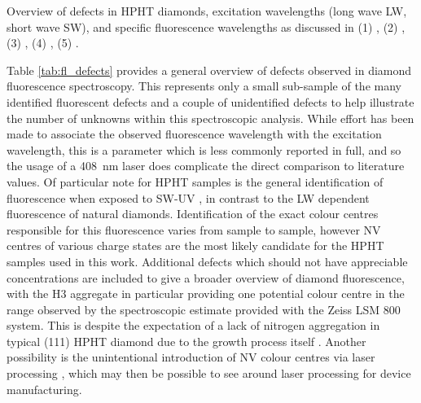 \begin{refsection}
\begin{table}[h]
\caption{Overview of defects in HPHT diamonds, excitation wavelengths (long wave LW, short wave SW), and specific fluorescence wavelengths as discussed in (1) \cite{eaton2017}, (2) \cite{burachenko2021}, (3) \cite{shigley2013}, (4) \cite{shenderova2019}, (5) \cite{Hardman2022}.}
\label{tab:fl_defects}
\end{table}

Table \ref{tab:fl_defects} provides a general overview of defects observed in diamond fluorescence spectroscopy. This represents only a small sub-sample of the many identified fluorescent defects and a couple of unidentified defects to help illustrate the number of unknowns within this spectroscopic analysis. While effort has been made to associate the observed fluorescence wavelength with the excitation wavelength, this is a parameter which is less commonly reported in full, and so the usage of a 408~\si{\nano\metre} laser does complicate the direct comparison to literature values. Of particular note for HPHT samples is the general identification of fluorescence when exposed to SW-UV \cite{eaton2017, shigley2013}, in contrast to the LW dependent fluorescence of natural diamonds. Identification of the exact colour centres responsible for this fluorescence varies from sample to sample, however NV centres of various charge states are the most likely candidate for the HPHT samples used in this work. Additional defects which should not have appreciable concentrations are included to give a broader overview of diamond fluorescence, with the H3 aggregate in particular providing one potential colour centre in the range observed by the spectroscopic estimate provided with the Zeiss LSM 800 system. This is despite the expectation of a lack of nitrogen aggregation in typical \hkl(111) HPHT diamond due to the growth process itself \cite{Burns1999}. Another possibility is the unintentional introduction of NV colour centres via laser processing \cite{chen2016}, which may then be possible to see around laser processing for device manufacturing. 


\end{refsection}

